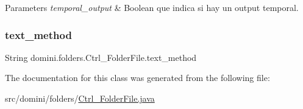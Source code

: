 \begin{DoxyParams}{Parameters}
{\em temporal\+\_\+output} & Boolean que indica si hay un output temporal. \\
\hline
\end{DoxyParams}
\mbox{\label{classdomini_1_1folders_1_1Ctrl__FolderFile_a75ef571be454360b835f552d2cf20741}} 
\subsubsection{\texorpdfstring{text\+\_\+method}{text\_method}}
{\footnotesize\ttfamily String domini.\+folders.\+Ctrl\+\_\+\+Folder\+File.\+text\+\_\+method\hspace{0.3cm}{\ttfamily [private]}}



The documentation for this class was generated from the following file\+:\begin{DoxyCompactItemize}
\item 
src/domini/folders/\hyperlink{Ctrl__FolderFile_8java}{Ctrl\+\_\+\+Folder\+File.\+java}\end{DoxyCompactItemize}
